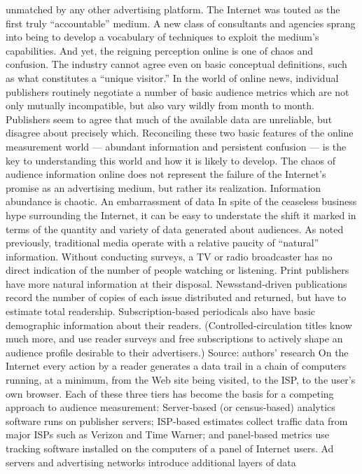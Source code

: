 unmatched by any other advertising platform. The Internet was touted as
the first truly ``accountable'' medium. A new class of consultants and
agencies sprang into being to develop a vocabulary of techniques to
exploit the medium’s capabilities.
And yet, the reigning perception online is one of chaos and confusion. The
industry cannot agree even on basic conceptual definitions, such as what
constitutes a ``unique visitor.'' In the world of online news, individual
publishers routinely negotiate a number of basic audience metrics which
are not only mutually incompatible, but also vary wildly from month to
month. Publishers seem to agree that much of the available data are
unreliable, but disagree about precisely which.
Reconciling these two basic features of the online measurement world —
abundant information and persistent confusion — is the key to
understanding this world and how it is likely to develop. The chaos of
audience information online does not represent the failure of the Internet’s
promise as an advertising medium, but rather its realization. Information
abundance is chaotic.
An embarrassment of data
In spite of the ceaseless business hype surrounding the Internet, it can be
easy to understate the shift it marked in terms of the quantity and variety
of data generated about audiences. As noted previously, traditional media
operate with a relative paucity of ``natural'' information. Without
conducting surveys, a TV or radio broadcaster has no direct indication of
the number of people watching or listening.
Print publishers have more natural information at their disposal.
Newsstand‐driven publications record the number of copies of each issue
distributed and returned, but have to estimate total readership.
Subscription‐based periodicals also have basic demographic information
about their readers. (Controlled‐circulation titles know much more, and
use reader surveys and free subscriptions to actively shape an audience
profile desirable to their advertisers.)
Source: authors’ research
On the Internet every action by a reader generates a data trail in a chain of
computers running, at a minimum, from the Web site being visited, to the
ISP, to the user’s own browser. Each of these three tiers has become the
basis for a competing approach to audience measurement: Server‐based
(or census‐based) analytics software runs on publisher servers; ISP‐based
estimates collect traffic data from major ISPs such as Verizon and Time
Warner; and panel‐based metrics use tracking software installed on the
computers of a panel of Internet users.
Ad servers and advertising networks introduce additional layers of data
